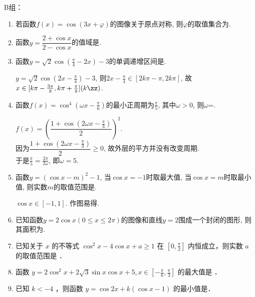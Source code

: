 B组：
\begin{enumerate}
    \item 若函数$f(x)=\cos(3x+\varphi)$的图像关于原点对称, 则$\varphi$的取值集合为. 

    \item 函数$y=\dfrac{2+\cos{x}}{2-\cos{x}}$的值域是\blkda{$[\frac{1}{3},3]$}.

    \item 函数$y=\sqrt{2}\cos(\frac{\pi}{4}-2x)-3$的单调递增区间是. 
\begin{jieda}
$y=\sqrt{2}\cos(2x-\frac{\pi}{4})-3$, 则$2x-\frac{\pi}{4}\in[2k\pi-\pi,2k\pi]$, 故$x\in[k\pi-\frac{3\pi}{8},k\pi+\frac{\pi}{8}](k\zz)$. 
\end{jieda}

    \item 函数$f(x)=\cos^4(\omega{x}-\frac{\pi}{6})$的最小正周期为$\frac{\pi}{5}$, 其中$\omega>0$, 则$\omega$=. 
\begin{jieda}
$f(x)=\left(\dfrac{1+\cos(2\omega{x}-\frac{\pi}{3})}{2}\right)^2$. \\
因为$\dfrac{1+\cos(2\omega{x}-\frac{\pi}{3})}{2}\geq 0$, 故外层的平方并没有改变周期. \\
于是$\frac{\pi}{5}=\frac{2\pi}{2\omega}$, 即$\omega=5$. 
\end{jieda}

    \item 函数$y=(\cos{x}-m)^2-1$, 当$\cos{x}=-1$时取最大值, 当$\cos{x}=m$时取最小值, 则实数$m$的取值范围是\blkda{$[0,1]$}. 
\begin{jieda}
$\cos{x}\in[-1,1]$. 作图易得. 
\end{jieda}

\item 已知函数$y=2\cos{x}(0\leq x\leq 2\pi)$的图像和直线$y=2$围成一个封闭的图形, 则其面积为\blkda{$4\pi$}.


\item 已知关于 $x$ 的不等式 $\cos ^2 x-4 \cos x+a \geq 1$ 在 $\left[0, \frac{\pi}{2}\right]$ 内恒成立，则实数 $a$ 的取值范围是\blkda[3]{$[4,+\infty)$} ．

\item 函数 $y=2 \cos ^2 x+2 \sqrt{3} \sin x \cos x+5, x \in\left[-\frac{\pi}{6}, \frac{\pi}{3}\right]$ 的最大值是  ．

\item 已知 $k<-4$ ，则函数 $y=\cos 2 x+k(\cos x-1)$ 的最小值是．


\end{enumerate}
